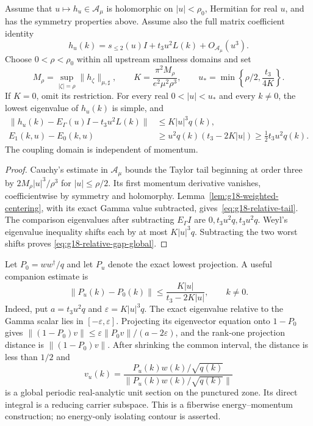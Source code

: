\begin{theorem}
\label{thm:g18-global-relative-gap}
Assume that $u\mapsto h_u\in\mathcal A_\mu$ is holomorphic on
$|u|<\rho_0$, Hermitian for real $u$, and has the symmetry properties above.
Assume also the full matrix coefficient identity
\[
 h_u(k)=s_{\le2}(u)I+t_3u^2L(k)+O_{\mathcal A_\mu}(u^3).
\]
Choose $0<\rho<\rho_0$ within all upstream smallness domains and set
\[
 M_\rho=\sup_{|\zeta|=\rho}\|h_\zeta\|_{\mu,\sharp},\qquad
 K=\frac{\pi^2M_\rho}{e^2\mu^2\rho^3},\qquad
 u_* = \min\left\{\rho/2,\frac{t_3}{4K}\right\}.
\]
If $K=0$, omit its restriction. For every real $0<|u|<u_*$ and every
$k\ne0$, the lowest eigenvalue of $h_u(k)$ is simple, and
\begin{align}
 \|h_u(k)-E_\Gamma(u)I-t_3u^2L(k)\|&\le K|u|^3q(k),
 \label{eq:g18-relative-tail}\\
 E_1(k,u)-E_0(k,u)&\ge u^2q(k)(t_3-2K|u|)
 \ge\tfrac12t_3u^2q(k).
 \label{eq:g18-relative-gap-global}
\end{align}
The coupling domain is independent of momentum.
\end{theorem}
\begin{proof}
Cauchy's estimate in $\mathcal A_\mu$ bounds the Taylor tail beginning at
order three by $2M_\rho|u|^3/\rho^3$ for $|u|\le\rho/2$.
Its first momentum derivative vanishes, coefficientwise by symmetry and
holomorphy. Lemma~\ref{lem:g18-weighted-centering}, with its exact Gamma
value subtracted, gives~\eqref{eq:g18-relative-tail}.
The comparison eigenvalues after subtracting $E_\Gamma I$ are
$0,t_3u^2q,t_3u^2q$. Weyl's eigenvalue inequality shifts each by at most
$K|u|^3q$. Subtracting the two worst shifts proves
\eqref{eq:g18-relative-gap-global}.
\end{proof}

Let $P_0=ww^\dagger/q$ and let $P_u$ denote the exact lowest projection.
A useful companion estimate is
\[
 \|P_u(k)-P_0(k)\|\le\frac{K|u|}{t_3-2K|u|},\qquad k\ne0.
\]
Indeed, put $a=t_3u^2q$ and $\varepsilon=K|u|^3q$.
The exact eigenvalue relative to the Gamma scalar lies in
$[-\varepsilon,\varepsilon]$. Projecting its eigenvector equation onto
$1-P_0$ gives
$\|(1-P_0)v\|\le\varepsilon\|P_0v\|/(a-2\varepsilon)$,
and the rank-one projection distance is $\|(1-P_0)v\|$.
After shrinking the common interval, the distance is less than $1/2$ and
\[
 v_u(k)=\frac{P_u(k)w(k)/\sqrt{q(k)}}
 {\|P_u(k)w(k)/\sqrt{q(k)}\|}
\]
is a global periodic real-analytic unit section on the punctured zone.
Its direct integral is a reducing carrier subspace. This is a fiberwise
energy--momentum construction; no energy-only isolating contour is asserted.

